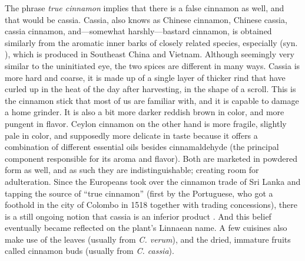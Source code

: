 The phrase \textit{true cinnamon} implies that there is a false cinnamon as well, and that would be cassia. Cassia, also knows as Chinese cinnamon, Chinese cassia, cassia cinnamon, and---somewhat harshly---bastard cinnamon, is obtained similarly from the aromatic inner barks of closely related species, especially  (syn. ), which is produced in Southeast China and Vietnam. Although seemingly very similar to the uninitiated eye, the two spices are different in many ways. Cassia is more hard and coarse, it is made up of a single layer of thicker rind that have curled up in the heat of the day after harvesting, in the shape of a scroll. This is the cinnamon stick that most of us are familiar with, and it is capable to damage a home grinder. It is also a bit more darker reddish brown in color, and more pungent in flavor. Ceylon cinnamon on the other hand is more fragile, slightly pale in color, and supposedly more delicate in taste because it offers a combination of different essential oils besides cinnamaldehyde (the principal component responsible for its aroma and flavor). Both are marketed in powdered form as well, and as such they are indistinguishable; creating room for adulteration. Since the Europeans took over the cinnamon trade of Sri Lanka and tapping the source of ``true cinnamon'' (first by the Portuguese, who got a foothold in the city of Colombo in 1518 together with trading concessions), there is a still ongoing notion that cassia is an inferior product \parencite{chennault_reclusive_2006}. And this belief eventually became reflected on the plant's Linnaean name. A few cuisines also make use of the leaves (usually from \textit{C. verum}), and the dried, immature fruits called cinnamon buds (usually from \textit{C. cassia}).


